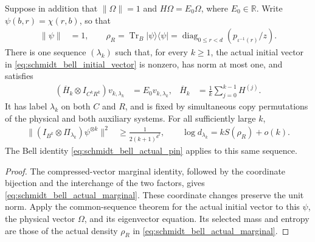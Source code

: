 \begin{theorem}
\label{thm:schmidt_bell_prevector_sequence}
\leanok
{}
Suppose in addition that $\|\Omega\|=1$ and $H\Omega=E_0\Omega$, where
$E_0\in\mathbb R$. Write $\psi(b,r)=\chi(r,b)$, so that
\begin{align}
 \|\psi\|&=1,\qquad
 \rho_R=\operatorname{Tr}_B|\psi\rangle\langle\psi|
     =\operatorname{diag}_{0\le r<d}(p_{\iota^{-1}(r)}/z).
 \label{eq:schmidt_bell_actual_marginal}
\end{align}
There is one sequence $(\lambda_k)$ such that, for every $k\ge1$, the actual
initial vector in \eqref{eq:schmidt_bell_initial_vector} is nonzero, has norm
at most one, and satisfies
\begin{align}
 (\overline H_k\otimes I_{C^kR^k})v_{k,\lambda_k}&=E_0v_{k,\lambda_k},
 &\overline H_k&=\frac1k\sum_{j=0}^{k-1}H^{(j)}.
 \label{eq:schmidt_bell_mean_energy}
\end{align}
It has label $\lambda_k$ on both $C$ and $R$, and is fixed by simultaneous
copy permutations of the physical and both auxiliary systems. For all
sufficiently large $k$,
\begin{align}
 \|(I_{B^k}\otimes\Pi_{\lambda_k})\psi^{\otimes k}\|^2
   &\ge\frac1{2(k+1)^{d^2}},\qquad
 \log d_{\lambda_k}=kS(\rho_R)+o(k).
 \label{eq:schmidt_bell_selected_mass_entropy}
\end{align}
The Bell identity \eqref{eq:schmidt_bell_actual_pin} applies to this same
sequence.
\end{theorem}
\begin{proof}
\leanok
{}
The compressed-vector marginal identity, followed by the coordinate
bijection and the interchange of the two factors, gives
\eqref{eq:schmidt_bell_actual_marginal}. These coordinate changes preserve
the unit norm. Apply the common-sequence theorem for the actual initial
vector to this $\psi$, the physical vector $\Omega$, and its eigenvector
equation. Its selected mass and entropy are those of the actual density
$\rho_R$ in \eqref{eq:schmidt_bell_actual_marginal}.
\end{proof}
